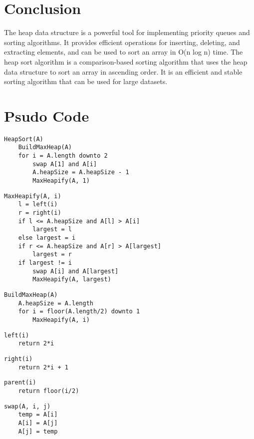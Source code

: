 \documentclass{article}
\begin{document}
\section*{Conclusion}
The heap data structure is a powerful tool for implementing priority queues and sorting algorithms. It provides efficient operations for inserting, deleting, and extracting elements, and can be used to sort an array in O(n log n) time. The heap sort algorithm is a comparison-based sorting algorithm that uses the heap data structure to sort an array in ascending order. It is an efficient and stable sorting algorithm that can be used for large datasets.
\section*{Psudo Code}
\begin{verbatim}
HeapSort(A)
    BuildMaxHeap(A)
    for i = A.length downto 2
        swap A[1] and A[i]
        A.heapSize = A.heapSize - 1
        MaxHeapify(A, 1)
\end{verbatim}
\begin{verbatim}
MaxHeapify(A, i)
    l = left(i)
    r = right(i)
    if l <= A.heapSize and A[l] > A[i]
        largest = l
    else largest = i
    if r <= A.heapSize and A[r] > A[largest]
        largest = r
    if largest != i
        swap A[i] and A[largest]
        MaxHeapify(A, largest)

\end{verbatim}
\begin{verbatim}
BuildMaxHeap(A)
    A.heapSize = A.length
    for i = floor(A.length/2) downto 1
        MaxHeapify(A, i)
\end{verbatim}
\begin{verbatim}
left(i)
    return 2*i
\end{verbatim}
\begin{verbatim}
right(i)
    return 2*i + 1
\end{verbatim}
\begin{verbatim}
parent(i)
    return floor(i/2)
\end{verbatim}
\begin{verbatim}
swap(A, i, j)
    temp = A[i]
    A[i] = A[j]
    A[j] = temp

\end{verbatim}
\end{document}
